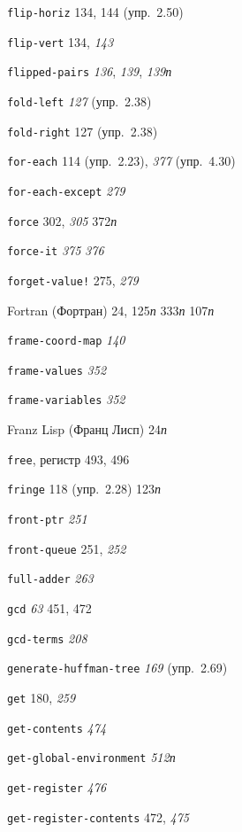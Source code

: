 \begin{theindex}
\item {\texttt{flip-horiz}} 134, 144 (упр.~2.50)
\item {\texttt{flip-vert}} 134, {\it 143}
\item {\texttt{flipped-pairs}} {\it 136}, {\it 139}, {\it 139}{\it п}
\item {\texttt{fold-left}} {\it 127} (упр.~2.38)
\item {\texttt{fold-right}} 127 (упр.~2.38)
\item {\texttt{for-each}} 114 (упр.~2.23), {\it 377} (упр.~4.30)
\item {\texttt{for-each-except}} {\it 279}
\item {\texttt{force}} 302, {\it 305}
   372{\it п}
\item {\texttt{force-it}} {\it 375}
   {\it 376}
\item {\texttt{forget-value!}} 275, {\it 279}
\item {Fortran (Фортран)} 24, 125{\it п}
   333{\it п}
   107{\it п}
\item {\texttt{frame-coord-map}} {\it 140}
\item {\texttt{frame-values}} {\it 352}
\item {\texttt{frame-variables}} {\it 352}
\item {Franz Lisp (Франц Лисп)} 24{\it п}
\item {\texttt{free}, регистр} 493, 496
\item {\texttt{fringe}} 118 (упр.~2.28)
   123{\it п}
\item {\texttt{front-ptr}} {\it 251}
\item {\texttt{front-queue}} 251, {\it 252}
\item {\texttt{full-adder}} {\it 263}
\bigskip
\item {\texttt{gcd}} {\it 63}
   451, 472
\item {\texttt{gcd-terms}} {\it 208}
\item {\texttt{generate-huffman-tree}} {\it 169} (упр.~2.69)
\item {\texttt{get}} 180, {\it 259}
\item {\texttt{get-contents}} {\it 474}
\item {\texttt{get-global-environment}} {\it 512}{\it п}
\item {\texttt{get-register}} {\it 476}
\item {\texttt{get-register-contents}} 472, {\it 475}

\end{theindex}
